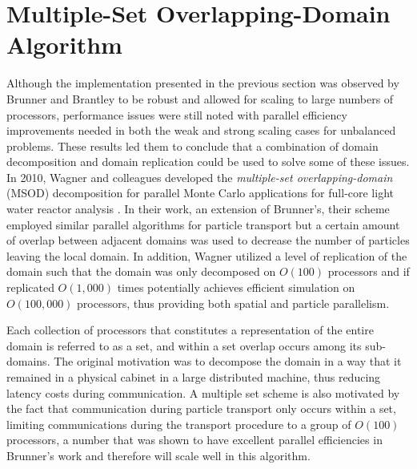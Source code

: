\section{Multiple-Set Overlapping-Domain Algorithm\ }
\label{subsec:msod}
Although the implementation presented in the previous section was
observed by Brunner and Brantley to be robust and allowed for scaling
to large numbers of processors, performance issues were still noted
with parallel efficiency improvements needed in both the weak and
strong scaling cases for unbalanced problems. These results led them
to conclude that a combination of domain decomposition and domain
replication could be used to solve some of these issues. In 2010,
Wagner and colleagues developed the \textit{multiple-set
  overlapping-domain} (MSOD) decomposition for parallel Monte Carlo
applications for full-core light water reactor analysis
\cite{wagner_hybrid_2010}. In their work, an extension of Brunner's,
their scheme employed similar parallel algorithms for particle
transport but a certain amount of overlap between adjacent domains was
used to decrease the number of particles leaving the local domain. In
addition, Wagner utilized a level of replication of the domain such
that the domain was only decomposed on $O(100)$ processors and if
replicated $O(1,000)$ times potentially achieves efficient simulation
on $O(100,000)$ processors, thus providing both spatial and particle
parallelism.

Each collection of processors that constitutes a representation of the
entire domain is referred to as a set, and within a set overlap occurs
among its sub-domains. The original motivation was to decompose the
domain in a way that it remained in a physical cabinet in a large
distributed machine, thus reducing latency costs during
communication. A multiple set scheme is also motivated by the fact
that communication during particle transport only occurs within a set,
limiting communications during the transport procedure to a group of
$O(100)$ processors, a number that was shown to have excellent
parallel efficiencies in Brunner's work and therefore will scale well
in this algorithm.

